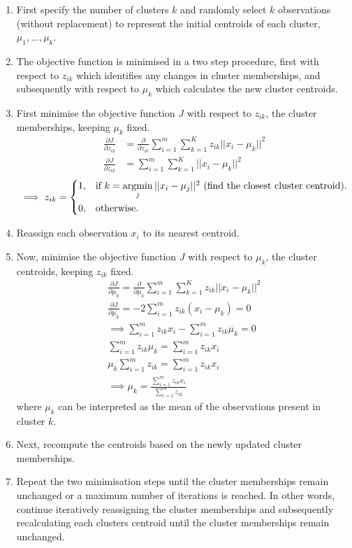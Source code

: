 \documentclass[]{article}
\DeclareMathOperator*{\argmin}{argmin}
\begin{document}
\begin{enumerate}	
	\item First specify the number of clusters $k$ and randomly select $k$ observations (without replacement) to represent the initial centroids of each cluster, $\mu_1, ..., \mu_k$. 
	\item The objective function is minimised in a two step procedure, first with respect to $z_{ik}$ which identifies any changes in cluster memberships, and subsequently with respect to $\mu_k$ which calculates the new cluster centroids.
	\item First minimise the objective function $J$ with respect to $z_{ik}$, the cluster memberships, keeping $\mu_k$ fixed.  
		\begin{equation}
			\begin{split}
				\frac{\partial J}{\partial z_{ik}} &= \frac{\partial}{\partial z_{ik}} \sum_{i=1}^{m} \sum_{k=1}^{K} z_{ik} || x_i - \mu_k||^2 \\
 				\frac{\partial J}{\partial z_{ik}} &= \sum_{i=1}^{m} \sum_{k=1}^{K} || x_i - \mu_k||^2
			\end{split}
		\end{equation}
		\[ 
		 \implies z_{ik} = 
  		\begin{dcases*} 
  			1, & if $k = \argmin\limits_j || x_i - \mu_j ||^2$ (find the closest cluster centroid).\\ 
  			0, & otherwise. 
  		\end{dcases*} 
		\]
	\item Reassign each observation $x_i$ to its nearest centroid.
	\item Now, minimise the objective function $J$ with respect to $\mu_k$, the cluster centroids, keeping $z_{ik}$ fixed.
		\begin{gather}
			\frac{\partial J}{\partial \mu_{k}} = \frac{\partial}{\partial \mu_{k}} \sum_{i=1}^{m} \sum_{k=1}^{K} z_{ik} || x_i - \mu_k||^2 \\
			\frac{\partial J}{\partial \mu_{k}} = -2 \sum_{i=1}^{m} z_{ik} (x_i - \mu_k) = 0\\
			\implies \sum_{i=1}^{m} z_{ik}x_i - \sum_{i=1}^{m} z_{ik}\mu_k = 0\\
			\sum_{i=1}^{m} z_{ik}\mu_k = \sum_{i=1}^{m} z_{ik}x_i \\
			\mu_k\sum_{i=1}^{m} z_{ik} = \sum_{i=1}^{m} z_{ik}x_i \\
			\implies \mu_k = \frac{\sum_{i=1}^{m}z_{ik}x_i}{\sum_{i=1}^{m} z_{ik}}
		 \end{gather}
where $\mu_k$ can be interpreted as the mean of the observations present in cluster $k$.
	\item Next, recompute the centroids based on the newly updated cluster memberships.
	\item Repeat the two minimisation steps until the cluster memberships remain unchanged or a maximum number of iterations is reached. In other words, continue iteratively reassigning the cluster memberships and subsequently recalculating each clusters centroid until the cluster memberships remain unchanged.
\end{enumerate}
\end{document}
